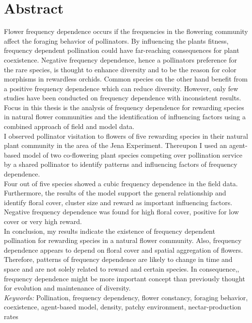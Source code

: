\label{ch:abstract}

\section*{Abstract}

Flower frequency dependence occurs if the frequencies in the flowering community affect the foraging behavior of   pollinators. By influencing the plants fitness, frequency dependent pollination could have far-reaching consequences for plant coexistence. Negative frequency dependence, hence a pollinators preference for the rare species, is thought to enhance diversity and to be the reason for color morphisms in rewardless orchids. Common species on the other hand benefit from a positive frequency dependence which can reduce diversity. However, only few studies have been conducted on frequency dependence with inconsistent results. Focus in this thesis is the analysis of frequency dependence for rewarding species in natural flower communities and the identification of influencing factors using a combined approach of field and model data.\\
I observed pollinator visitation to flowers of five rewarding species in their natural plant community in the area of the Jena Experiment. Thereupon I used an agent-based model of two co-flowering plant species competing over pollination service by a shared pollinator to identify patterns and influencing factors of frequency dependence. \\
Four out of five species showed a cubic frequency dependence in the field data. Furthermore, the results of the model support the general relationship and identify floral cover, cluster size and reward as important influencing factors. Negative frequency dependence was found for high floral cover, positive for low cover or very high reward.\\
In conclusion, my results indicate the existence of frequency dependent pollination for rewarding species in a natural flower community. Also, frequency dependence appears to depend on floral cover and spatial aggregation of flowers. Therefore, patterns of frequency dependence are likely to change in time and space and are not solely related to reward and certain species. In consequence,, frequency dependence might be more important concept than previously thought for evolution and maintenance of diversity. \\

\vspace{1cm}
\small{{\textit{Keywords:} Pollination, frequency dependency, flower constancy, foraging behavior, coexistence, agent-based model, density, patchy environment, nectar-production rates}}
